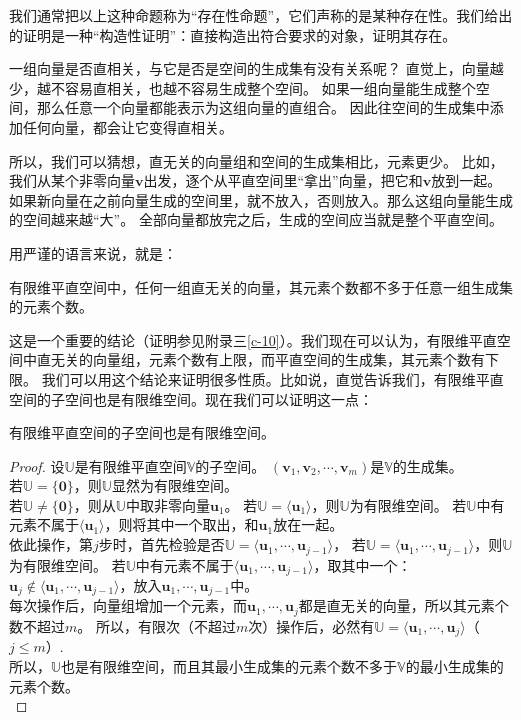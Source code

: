 \documentclass[12pt,UTF8,fontset=none]{ctexbook}
\begin{document}
我们通常把以上这种命题称为“存在性命题”，它们声称的是某种存在性。我们给出的证明是一种“构造性证明”：直接构造出符合要求的对象，证明其存在。

一组向量是否直相关，与它是否是空间的生成集有没有关系呢？
直觉上，向量越少，越不容易直相关，也越不容易生成整个空间。
如果一组向量能生成整个空间，那么任意一个向量都能表示为这组向量的直组合。
因此往空间的生成集中添加任何向量，都会让它变得直相关。

所以，我们可以猜想，直无关的向量组和空间的生成集相比，元素更少。
比如，我们从某个非零向量$\mathbf{v}$出发，逐个从平直空间里“拿出”向量，把它和$\mathbf{v}$放到一起。
如果新向量在之前向量生成的空间里，就不放入，否则放入。那么这组向量能生成的空间越来越“大”。
全部向量都放完之后，生成的空间应当就是整个平直空间。

用严谨的语言来说，就是：
\begin{pp}\label{pp:2_3}
    有限维平直空间中，任何一组直无关的向量，其元素个数都不多于任意一组生成集的元素个数。
\end{pp}
 
这是一个重要的结论（证明参见附录三\ref{c-10}）。我们现在可以认为，有限维平直空间中直无关的向量组，元素个数有上限，而平直空间的生成集，其元素个数有下限。
我们可以用这个结论来证明很多性质。比如说，直觉告诉我们，有限维平直空间的子空间也是有限维空间。现在我们可以证明这一点：

\begin{pp}\label{pp:2_4}
    有限维平直空间的子空间也是有限维空间。
\end{pp}
\begin{proof} %
    设$\mathbb{U}$是有限维平直空间$\mathbb{V}$的子空间。
    $(\mathbf{v}_1, \mathbf{v}_2, \cdots , \mathbf{v}_m )$是$\mathbb{V}$的生成集。\\
    若$\mathbb{U} = \{\mathbf{0}\}$，则$\mathbb{U}$显然为有限维空间。\\
    若$\mathbb{U} \neq \{\mathbf{0}\}$，则从$\mathbb{U}$中取非零向量$\mathbf{u}_1$。
    若$\mathbb{U} = \langle\mathbf{u}_1\rangle$，则$\mathbb{U}$为有限维空间。
    若$\mathbb{U}$中有元素不属于$\langle\mathbf{u}_1\rangle$，则将其中一个取出，和$\mathbf{u}_1$放在一起。\\
    依此操作，第$j$步时，首先检验是否$\mathbb{U} = \langle\mathbf{u}_1, \cdots , \mathbf{u}_{j-1}\rangle$，
    若$\mathbb{U} = \langle\mathbf{u}_1, \cdots , \mathbf{u}_{j-1}\rangle$，则$\mathbb{U}$为有限维空间。
    若$\mathbb{U}$中有元素不属于$\langle\mathbf{u}_1, \cdots , \mathbf{u}_{j-1}\rangle$，取其中一个：
    $\mathbf{u}_j \notin \langle\mathbf{u}_1, \cdots , \mathbf{u}_{j-1}\rangle$，放入$\mathbf{u}_1, \cdots , \mathbf{u}_{j-1}$中。 \\
    每次操作后，向量组增加一个元素，而$\mathbf{u}_1, \cdots , \mathbf{u}_{j}$都是直无关的向量，所以其元素个数不超过$m$。
    所以，有限次（不超过$m$次）操作后，必然有$\mathbb{U} = \langle\mathbf{u}_1,\cdots , \mathbf{u}_{j}\rangle$（$j \leqslant m$）.\\
    所以，$\mathbb{U}$也是有限维空间，而且其最小生成集的元素个数不多于$\mathbb{V}$的最小生成集的元素个数。\\
\end{proof}
\end{document}
